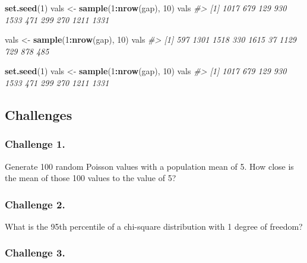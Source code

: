 \documentclass[
]{book}
\newenvironment{Shaded}{\begin{snugshade}}{\end{snugshade}}
\newcommand{\CommentTok}[1]{\textcolor[rgb]{0.56,0.35,0.01}{\textit{#1}}}
\newcommand{\DecValTok}[1]{\textcolor[rgb]{0.00,0.00,0.81}{#1}}
\newcommand{\KeywordTok}[1]{\textcolor[rgb]{0.13,0.29,0.53}{\textbf{#1}}}
\newcommand{\NormalTok}[1]{#1}
\newcommand{\OperatorTok}[1]{\textcolor[rgb]{0.81,0.36,0.00}{\textbf{#1}}}
\newcommand{\StringTok}[1]{\textcolor[rgb]{0.31,0.60,0.02}{#1}}
\begin{document}
\begin{Shaded}
\begin{Highlighting}[]
\KeywordTok{set.seed}\NormalTok{(}\DecValTok{1}\NormalTok{)}
\NormalTok{vals <-}\StringTok{ }\KeywordTok{sample}\NormalTok{(}\DecValTok{1}\OperatorTok{:}\KeywordTok{nrow}\NormalTok{(gap), }\DecValTok{10}\NormalTok{)}
\NormalTok{vals}
\CommentTok{#>  [1] 1017  679  129  930 1533  471  299  270 1211 1331}

\NormalTok{vals <-}\StringTok{ }\KeywordTok{sample}\NormalTok{(}\DecValTok{1}\OperatorTok{:}\KeywordTok{nrow}\NormalTok{(gap), }\DecValTok{10}\NormalTok{)}
\NormalTok{vals}
\CommentTok{#>  [1]  597 1301 1518  330 1615   37 1129  729  878  485}

\KeywordTok{set.seed}\NormalTok{(}\DecValTok{1}\NormalTok{)}
\NormalTok{vals <-}\StringTok{ }\KeywordTok{sample}\NormalTok{(}\DecValTok{1}\OperatorTok{:}\KeywordTok{nrow}\NormalTok{(gap), }\DecValTok{10}\NormalTok{)}
\NormalTok{vals}
\CommentTok{#>  [1] 1017  679  129  930 1533  471  299  270 1211 1331}
\end{Highlighting}
\end{Shaded}

\hypertarget{challenges-9}{%
\subsection{Challenges}\label{challenges-9}}

\hypertarget{challenge-1.-7}{%
\subsubsection*{Challenge 1.}\label{challenge-1.-7}}

Generate 100 random Poisson values with a population mean of 5. How close is the mean of those 100 values to the value of 5?

\hypertarget{challenge-2.-6}{%
\subsubsection*{Challenge 2.}\label{challenge-2.-6}}

What is the 95th percentile of a chi-square distribution with 1 degree of freedom?

\hypertarget{challenge-3.-4}{%
\subsubsection*{Challenge 3.}\label{challenge-3.-4}}
\end{document}
